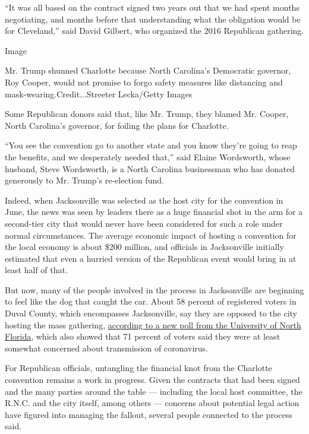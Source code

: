 ``It was all based on the contract signed two years out that we had
spent months negotiating, and months before that understanding what the
obligation would be for Cleveland,'' said David Gilbert, who organized
the 2016 Republican gathering.

Image

Mr. Trump shunned Charlotte because North Carolina's Democratic
governor, Roy Cooper, would not promise to forgo safety measures like
distancing and mask-wearing.Credit...Streeter Lecka/Getty Images

Some Republican donors said that, like Mr. Trump, they blamed Mr.
Cooper, North Carolina's governor, for foiling the plans for Charlotte.

``You see the convention go to another state and you know they're going
to reap the benefits, and we desperately needed that,'' said Elaine
Wordsworth, whose husband, Steve Wordsworth, is a North Carolina
businessman who has donated generously to Mr. Trump's re-election fund.

Indeed, when Jacksonville was selected as the host city for the
convention in June, the news was seen by leaders there as a huge
financial shot in the arm for a second-tier city that would never have
been considered for such a role under normal circumstances. The average
economic impact of hosting a convention for the local economy is about
\$200 million, and officials in Jacksonville initially estimated that
even a hurried version of the Republican event would bring in at least
half of that.

But now, many of the people involved in the process in Jacksonville are
beginning to feel like the dog that caught the car. About 58 percent of
registered voters in Duval County, which encompasses Jacksonville, say
they are opposed to the city hosting the mass gathering,
\href{https://www.unf.edu/uploadedFiles/aa/coas/porl/JaxSpeaks0620.pdf}{according
to a new poll from the University of North Florida}, which also showed
that 71 percent of voters said they were at least somewhat concerned
about transmission of coronavirus.

For Republican officials, untangling the financial knot from the
Charlotte convention remains a work in progress. Given the contracts
that had been signed and the many parties around the table --- including
the local host committee, the R.N.C. and the city itself, among others
--- concerns about potential legal action have figured into managing the
fallout, several people connected to the process said.

